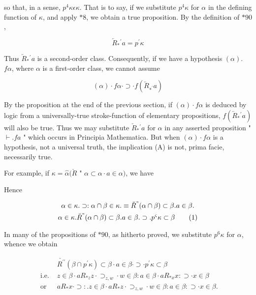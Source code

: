 \documentclass[10pt]{article}
\begin{document}
so that, in a sense, $p^{4} \kappa \epsilon \kappa$. That is to say, if we substitute $p^{4} \kappa$ for $\alpha$ in the defining function of $\kappa$, and apply $* 8$, we obtain a true proposition. By the definition of $* 90$,

$$
\overleftarrow{R}_{*}{ }^{\prime} a=p^{\prime} \kappa
$$

Thus $\overleftarrow{R}_{*}{ }^{\prime} a$ is a second-order class. Consequently, if we have a hypothesis $(\alpha)$. $f \alpha$, where $\alpha$ is a first-order class, we cannot assume


\begin{equation*}
(\alpha) \cdot f \alpha \cdot \supset \cdot f\left(\overleftarrow{R}_{*^{\prime}} a\right) \tag{A}
\end{equation*}


By the proposition at the end of the previous section, if $(\alpha) \cdot f \alpha$ is deduced by logic from a universally-true stroke-function of elementary propositions, $f\left(\overleftarrow{R}_{*}{ }^{\prime} a\right)$ will also be true. Thus we may substitute $\overleftarrow{R}_{*}{ }^{\prime} a$ for $\alpha$ in any asserted proposition " $\vdash . f a$ " which occurs in Principia Mathematica. But when $(\alpha) \cdot f \alpha$ is a hypothesis, not a universal truth, the implication (A) is not, prima facie, necessarily true.

For example, if $\kappa=\hat{\alpha}(\breve{R}$ " $\alpha \subset \alpha \cdot a \in \alpha)$, we have

Hence


\begin{gather*}
\alpha \in \kappa . \supset: \alpha \cap \beta \in \kappa . \equiv \breve{R}^{"}(\alpha \cap \beta) \subset \beta . a \in \beta . \\
\alpha \in \kappa . \breve{R}^{"}(\alpha \cap \beta) \subset \beta . a \in \beta . \supset . p^{\varsigma} \kappa \subset \beta \tag{1}
\end{gather*}


In many of the propositions of $* 90$, as hitherto proved, we substitute $p^{6} \kappa$ for $\alpha$, whence we obtain

\[
\begin{array}{cc} 
& \breve{R^{\prime \prime}}\left(\beta \cap p^{\prime} \kappa\right) \subset \beta \cdot a \in \beta \cdot \supset \cdot p^{\prime} \kappa \subset \beta  \tag{2}\\
\text { i.e. } & z \in \beta \cdot a R_{* z} z \cdot \supset_{z, w} \cdot w \in \beta: a \in \beta \cdot a R_{* x} x: \supset \cdot x \in \beta \\
\text { or } & a R_{*} x \cdot \supset: . z \in \beta \cdot a R_{*} z \cdot \supset_{z, w} \cdot w \in \beta: a \in \beta: \supset \cdot x \in \beta .
\end{array}
\]
\end{document}
